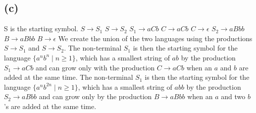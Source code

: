\documentclass[12pt]{article}
\begin{document}
\subsection*{(c)} S is the starting symbol.
\newline
$S \rightarrow S_1$ \newline
$S \rightarrow S_2$ \newline
$S_1 \rightarrow aCb$ \newline
$C \rightarrow aCb$ \newline
$C \rightarrow \epsilon $ \newline
$S_2 \rightarrow aBbb$ \newline
$B \rightarrow aBbb$ \newline
$B \rightarrow \epsilon $ \newline
We create the union of the two languages using the productions
$S \rightarrow S_1$ and $S \rightarrow S_2$. The non-terminal $S_1$ is then the
starting symbol for the language $\{a^{n}b^{n}\mid n \geq 1\}$, which has a
smallest string of $ab$ by the production $S_1 \rightarrow aCb$ and can grow
only with the production $C \rightarrow aCb$ when an $a$ and $b$ are added at
the same time. The non-terminal $S_1$ is then the starting symbol for the
language $\{a^{n}b^{2n}\mid n \geq 1\}$, which has a smallest string of $abb$
by the production $S_2 \rightarrow aBbb$ and can grow only by the production
$B \rightarrow aBbb$ when an $a$ and two $b$'s are added at the same time.
\end{document}
